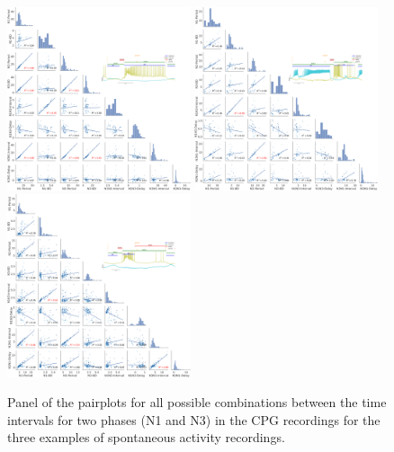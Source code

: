 \begin{figure}[htbp]
	\centering
	\includegraphics[width=0.48\textwidth]{./img/invariants/data/SUSSEX/prep2/images/2phases/panel_with_pairplot.png}
	\includegraphics[width=0.48\textwidth]{./img/invariants/data/SUSSEX/prep3/images/2phases/panel_with_pairplot.png}
	\includegraphics[width=0.48\textwidth]{./img/invariants/data/SUSSEX/prep1/images/2phases/panel_with_pairplot.png}
	\caption{Panel of the pairplots for all possible combinations between the time intervals for two phases (N1 and N3) in the CPG recordings for the three examples of spontaneous activity recordings.}
	\label{fig:spontaneous pairplot comparison}
\end{figure}


